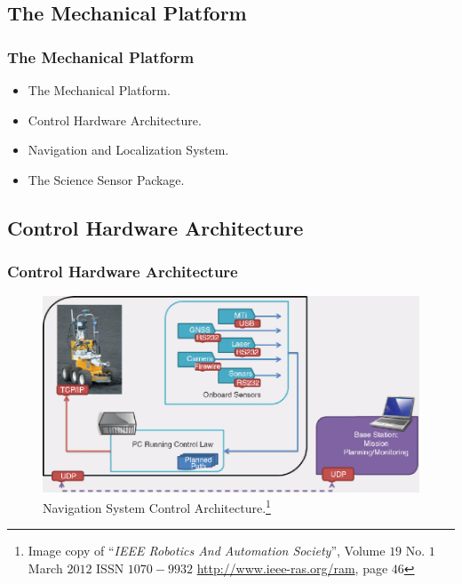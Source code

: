 \documentclass[xcolor=svgnames]{beamer}
\begin{document}
\subsection{The Mechanical Platform}
\begin{frame}
 \frametitle{The Mechanical Platform}
\begin{itemize}
 \item The Mechanical Platform. \pause
 \item Control Hardware Architecture. \pause
 \item Navigation and Localization System. \pause
 \item The Science Sensor Package.
\end{itemize}
\end{frame}

\subsection{Control Hardware Architecture}
\begin{frame}
 \frametitle{Control Hardware Architecture}
   \begin{figure}[H]
	\centering
      \includegraphics[scale=0.343]{plain.png}
	\caption{Navigation System Control Architecture.\footnote{Image copy of ``\textit{IEEE Robotics And Automation Society}'', Volume $19$ No. $1$ March $2012$ ISSN $1070-9932$ \url{http://www.ieee-ras.org/ram}, page $46$}}
      \label{fig25}
    \end{figure}
\end{frame}
\end{document}
